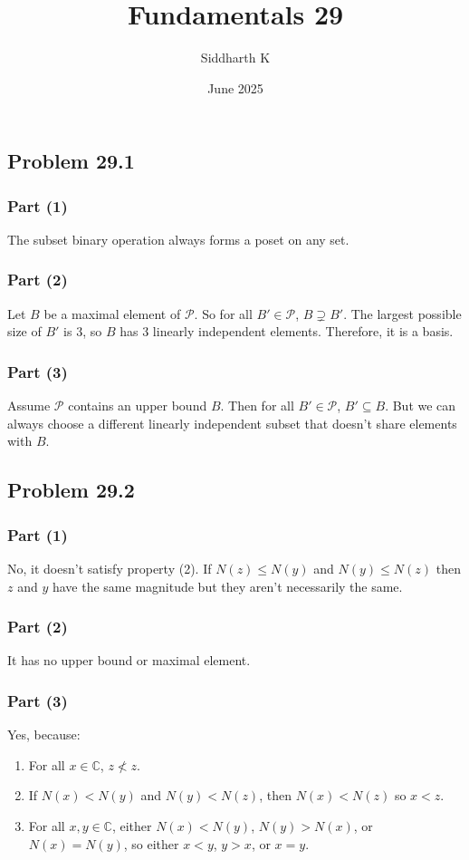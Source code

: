 \documentclass{article}
\title{Fundamentals 29}
\author{Siddharth K}
\date{June 2025}
\newcommand{\C}{\mathbb{C}}
\newcommand{\power}{\mathcal{P}}
\begin{document}
\maketitle

\subsection*{Problem 29.1}
\subsubsection*{Part (1)}
The subset binary operation always forms a poset on any set.

\subsubsection*{Part (2)}
Let $B$ be a maximal element of $\power$. So for all $B' \in \power$, $B \supsetneq B'$. The largest possible size of $B'$ is $3$, so $B$ has $3$ linearly independent elements. Therefore, it is a basis.

\subsubsection*{Part (3)} Assume $\power$ contains an upper bound $B$. Then for all $B' \in \power$, $B' \subseteq B$. But we can always choose a different linearly independent subset that doesn't share elements with $B$.

\subsection*{Problem 29.2}
\subsubsection*{Part (1)}
No, it doesn't satisfy property (2). If $N(z) \le N(y)$ and $N(y) \le N(z)$ then $z$ and $y$ have the same magnitude but they aren't necessarily the same.

\subsubsection*{Part (2)} It has no upper bound or maximal element.

\subsubsection*{Part (3)}
Yes, because:
\begin{enumerate}
    \item For all $x \in \C$, $z \not< z$.
    \item If $N(x) < N(y)$ and $N(y) < N(z)$, then $N(x) < N(z)$ so $x < z$.
    \item For all $x, y \in \C$, either $N(x) < N(y)$, $N(y) > N(x)$, or $N(x) = N(y)$, so either $x < y$, $y > x$, or $x = y$.
\end{enumerate}
\end{document}
